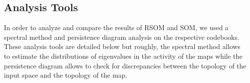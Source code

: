 

\subsection{Analysis Tools}
In order to analyze and compare the results of RSOM and SOM, we used a spectral method and persistence diagram analysis on the respective codebooks. These analysis tools are detailed below but roughly, the spectral method allows to estimate the distributions of eigenvalues in the activity of the maps while the persistence diagram allows to check for discrepancies between the topology of the input space and the topology of the map.

